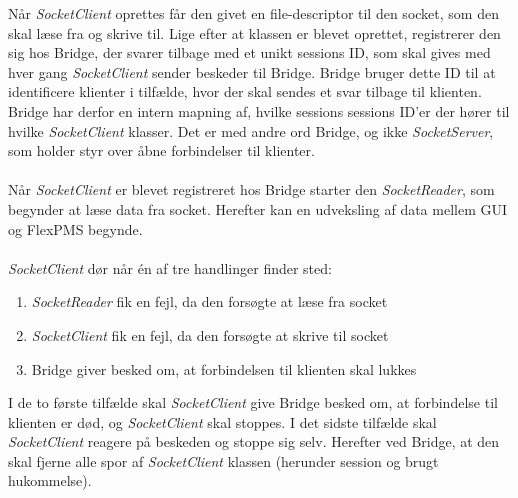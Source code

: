 Når \textit{SocketClient} oprettes får den givet en file-descriptor til den socket, som den skal læse fra og skrive til. Lige efter at klassen er blevet oprettet, registrerer den sig hos Bridge, der svarer tilbage med et unikt sessions ID, som skal gives med hver gang \textit{SocketClient} sender beskeder til Bridge. Bridge bruger dette ID til at identificere klienter i tilfælde, hvor der skal sendes et svar tilbage til klienten. Bridge har derfor en intern mapning af, hvilke sessions sessions ID'er der hører til hvilke \textit{SocketClient} klasser. Det er med andre ord Bridge, og ikke \textit{SocketServer}, som holder styr over åbne forbindelser til klienter.\\\\

Når \textit{SocketClient} er blevet registreret hos Bridge starter den \textit{SocketReader}, som begynder at læse data fra socket. Herefter kan en udveksling af data mellem GUI og FlexPMS begynde.\\\\

\textit{SocketClient} dør når én af tre handlinger finder sted:

\begin{enumerate}
\item \textit{SocketReader} fik en fejl, da den forsøgte at læse fra socket
\item \textit{SocketClient} fik en fejl, da den forsøgte at skrive til socket
\item Bridge giver besked om, at forbindelsen til klienten skal lukkes 
\end{enumerate}

I de to første tilfælde skal \textit{SocketClient} give Bridge besked om, at forbindelse til klienten er død, og \textit{SocketClient} skal stoppes. I det sidste tilfælde skal \textit{SocketClient} reagere på beskeden og stoppe sig selv. Herefter ved Bridge, at den skal fjerne alle spor af \textit{SocketClient} klassen (herunder session og brugt hukommelse).


